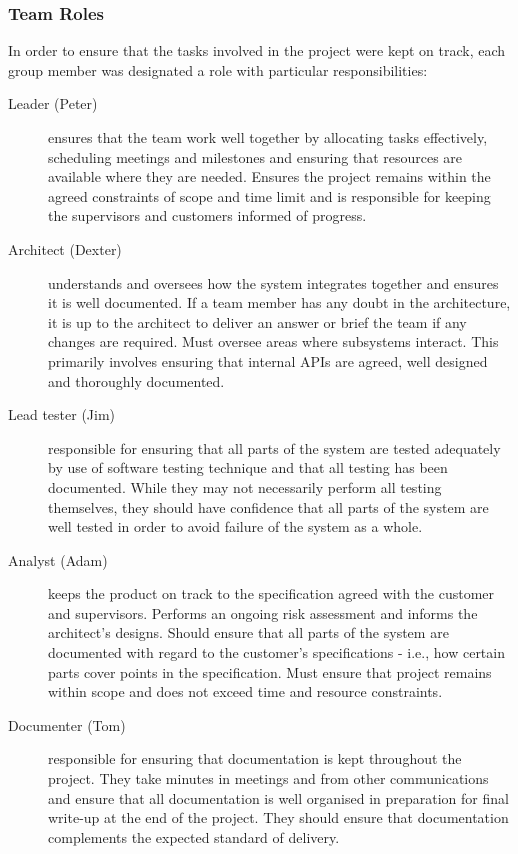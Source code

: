 \subsubsection{Team Roles}

In order to ensure that the tasks involved in the project were kept on track, each group member was designated a role with particular responsibilities:

\begin{description}
\item[Leader (Peter)] ensures that the team work well together by allocating tasks effectively, scheduling meetings and milestones and ensuring that resources are available where they are needed. Ensures the project remains within the agreed constraints of scope and time limit and is responsible for keeping the supervisors and customers informed of progress.
\item[Architect (Dexter)] understands and oversees how the system integrates together and ensures it is well documented. If a team member has any doubt in the architecture, it is up to the architect to deliver an answer or brief the team if any changes are required. Must oversee areas where subsystems interact. This primarily involves ensuring that internal APIs are agreed, well designed and thoroughly documented.
\item[Lead tester (Jim)] responsible for ensuring that all parts of the system are tested adequately by use of software testing technique and that all testing has been documented. While they may not necessarily perform all testing themselves, they should have confidence that all parts of the system are well tested in order to avoid failure of the system as a whole.
\item[Analyst (Adam)] keeps the product on track to the specification agreed with the customer and supervisors. Performs an ongoing risk assessment and informs the architect's designs. Should ensure that all parts of the system are documented with regard to the customer's specifications - i.e., how certain parts cover points in the specification. Must ensure that project remains within scope and does not exceed time and resource constraints.
\item[Documenter (Tom)] responsible for ensuring that documentation is kept throughout the project. They take minutes in meetings and from other communications and ensure that all documentation is well organised in preparation for final write-up at the end of the project. They should ensure that documentation complements the expected standard of delivery.
\end{description}

